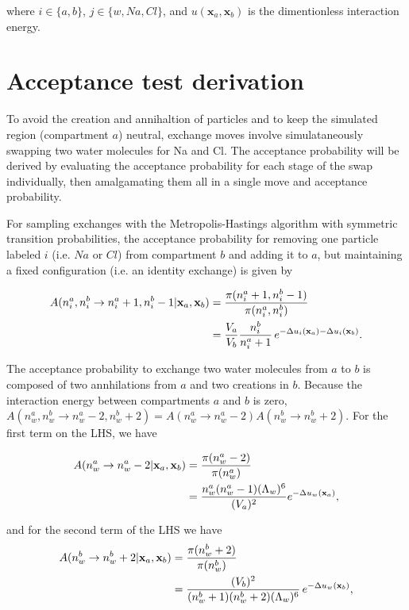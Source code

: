 \documentclass[11pt]{article} %
\begin{document}
where $i \in \{a,b\}$, $j \in \{w, Na, Cl\}$, and $u(\mathbf{x}_a,\mathbf{x}_b)$ is the dimentionless interaction energy.

\section{Acceptance test derivation}
To avoid the creation and annihaltion of particles and to keep the simulated region (compartment $a$) neutral, exchange moves involve simulataneously swapping two water molecules for Na and Cl. The acceptance probability will be derived by evaluating the acceptance probability for each stage of the swap individually, then amalgamating them all in a single move and acceptance probability. 

For sampling exchanges with the Metropolis-Hastings algorithm with symmetric transition probabilities, the acceptance probability for removing one particle labeled $i$ (i.e. $Na$ or $Cl$) from compartment $b$ and adding it to $a$, but maintaining a fixed configuration (i.e. an identity exchange) is given by

\begin{align}
A(n_i^a,n_i^b \rightarrow n_i^a + 1, n_i^b-1|\mathbf{x}_a,\mathbf{x}_b) &= \frac{\pi(n_i^a + 1, n_i^b-1)}{\pi(n_i^a,n_i^b)} \notag\\
&= \frac{V_a}{V_b} \frac{n^b_i}{n^a_i + 1} \, e^{-\Delta u_i(\mathbf{x}_a) - \Delta u_i(\mathbf{x}_b)}.
\end{align}

The acceptance probability to exchange two water molecules from $a$ to $b$ is composed of two annhilations from $a$ and two creations in $b$. Because the interaction energy between compartments $a$ and $b$ is zero, $A(n_w^a,n_w^b \rightarrow n_w^a - 2,n_w^b + 2) = A(n_w^a \rightarrow n_w^a - 2)A(n_w^b \rightarrow n_w^b + 2)$. For the first term on the LHS, we have

\begin{align}
A(n_w^a \rightarrow n_w^a - 2|\mathbf{x}_a,\mathbf{x}_b) & = \frac{\pi(n_w^a - 2)}{\pi(n_w^a)} \notag\\
&= \frac{n_w^a(n_w^a - 1)(\Lambda_w)^6 }{(V_a)^2} e^{-\Delta u_w(\mathbf{x}_a)},
\end{align}

and for the second term of the LHS we have
\begin{align}
A(n_w^b \rightarrow n_w^b + 2|\mathbf{x}_a,\mathbf{x}_b) &= \frac{\pi(n_w^b + 2)}{\pi(n_w^b)} \notag\\
&= \frac{(V_b)^2}{(n_w^b +1)(n_w^b +2)(\Lambda_w)^6} \, e^{-\Delta u_w(\mathbf{x}_b)},
\end{align}
\end{document}
